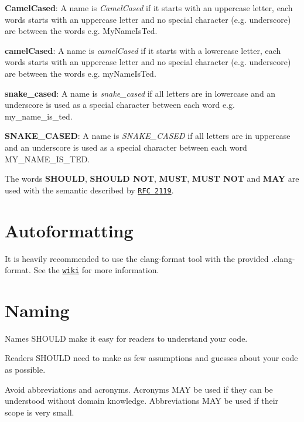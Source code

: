 \begin{DoxyItemize}
\item {\bfseries Camel\+Cased}\+: A name is {\itshape Camel\+Cased} if it starts with an uppercase letter, each words starts with an uppercase letter and no special character (e.\+g. underscore) are between the words e.\+g. My\+Name\+Is\+Ted.
\item {\bfseries camel\+Cased}\+: A name is {\itshape camel\+Cased} if it starts with a lowercase letter, each words starts with an uppercase letter and no special character (e.\+g. underscore) are between the words e.\+g. my\+Name\+Is\+Ted.
\item {\bfseries snake\+\_\+cased}\+: A name is {\itshape snake\+\_\+cased} if all letters are in lowercase and an underscore is used as a special character between each word e.\+g. my\+\_\+name\+\_\+is\+\_\+ted.
\item {\bfseries S\+N\+A\+K\+E\+\_\+\+C\+A\+S\+ED}\+: A name is {\itshape S\+N\+A\+K\+E\+\_\+\+C\+A\+S\+ED} if all letters are in uppercase and an underscore is used as a special character between each word M\+Y\+\_\+\+N\+A\+M\+E\+\_\+\+I\+S\+\_\+\+T\+ED.
\end{DoxyItemize}

The words {\bfseries S\+H\+O\+U\+LD}, {\bfseries S\+H\+O\+U\+LD N\+OT}, {\bfseries M\+U\+ST}, {\bfseries M\+U\+ST N\+OT} and {\bfseries M\+AY} are used with the semantic described by \href{https://www.ietf.org/rfc/rfc2119.txt}{\tt R\+FC 2119}.

\section*{Autoformatting}

It is heavily recommended to use the {\ttfamily clang-\/format} tool with the provided {\ttfamily .clang-\/format}. See the \href{https://github.com/Autonomous-Racing-PG/ar-tu-do/wiki/Formatting-Cpp-and-Python-code}{\tt wiki} for more information.

\section*{Naming}

Names S\+H\+O\+U\+LD make it easy for readers to understand your code.

Readers S\+H\+O\+U\+LD need to make as few assumptions and guesses about your code as possible.

Avoid abbreviations and acronyms. Acronyms M\+AY be used if they can be understood without domain knowledge. Abbreviations M\+AY be used if their scope is very small.

